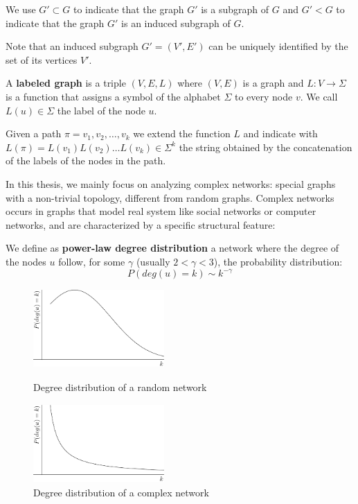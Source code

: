 We use $G' \subset G$ to indicate that the graph $G'$ is a subgraph of $G$ and $G' < G$ to indicate that the graph $G'$ is an induced subgraph of $G$.\medskip

Note that an induced subgraph $G' = (V', E')$ can be uniquely identified by the set of its vertices $V'$.

\begin{definizione}\label{def:labeledgraph}
	A \textbf{labeled graph} is a triple $(V,E,L)$ where $(V,E)$ is a graph and $L : V \rightarrow \Sigma$
	is a function that assigns a symbol of the alphabet $\Sigma$ to every node $v$. We call $L(u) \in \Sigma$ the label of the node $u$.
\end{definizione}

Given a path $\pi = v_{1}, v_{2}, \ldots, v_{k}$ we extend the function $L$ and indicate with $L(\pi) = L(v_{1}) L(v_{2}) \ldots L(v_{k}) \in \Sigma^{k}$ the string obtained by the concatenation of the labels of the nodes in the path.\medskip

In this thesis, we mainly focus on analyzing complex networks: special graphs with a non-trivial topology, different from random graphs. Complex networks occurs in graphs that model real system like social networks or computer networks, and are characterized by a specific structural feature:

\begin{definizione}\label{def:power-law-graph}
	We define as \textbf{power-law degree distribution} a network where the degree of the nodes $u$ follow, for some $\gamma$ (usually $2 < \gamma < 3$), the probability distribution:
	\begin{equation}
	P(deg(u) = k) \sim k^{-\gamma}  
	\end{equation}
\end{definizione}

\begin{figure}[h]
	\centering
	\begin{minipage}[t]{.45\textwidth}
		\centering
		\includegraphics[width=5cm,height=3cm]{figure/figure-1-1}
		\caption{Degree distribution of a random network}
	\end{minipage}\hfill
	\begin{minipage}[t]{.45\textwidth}
		\centering 
		\includegraphics[width=5cm,height=3cm]{figure/figure-1-2}
		\caption{Degree distribution of a complex network}
	\end{minipage}
\end{figure}

